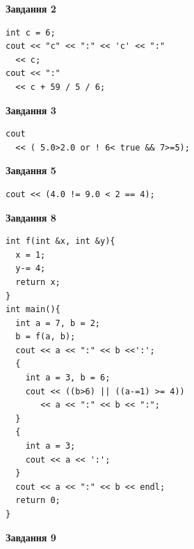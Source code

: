 \documentclass[12pt, ukrainian]{article}
\begin{document}
{\begin {large}
\begin{minipage}[t]{7.0cm}
\end{minipage}
\vline \hspace{1mm}
\begin{minipage}[t]{11.0cm}

\begin{center}
\textbf{Завдання 2}
\end{center}
\vspace{-8mm}

\begin{verbatim}
int c = 6;
cout << "c" << ":" << 'c' << ":" 
  << c;
cout << ":" 
  << c + 59 / 5 / 6;
\end{verbatim}



\begin{center}
\textbf{Завдання 3}
\end{center}
\vspace{-8mm}

\begin{verbatim}
cout 
  << ( 5.0>2.0 or ! 6< true && 7>=5);
\end{verbatim}



\begin{center}
\textbf{Завдання 5}
\end{center}
\vspace{-8mm}

\begin{verbatim}
cout << (4.0 != 9.0 < 2 == 4);
\end{verbatim}



\begin{center}
\textbf{Завдання 8}
\end{center}
\vspace{-8mm}

\begin{verbatim}
int f(int &x, int &y){
  x = 1;
  y-= 4;
  return x;
}
int main(){
  int a = 7, b = 2;
  b = f(a, b);
  cout << a << ":" << b <<':';
  {
    int a = 3, b = 6;
    cout << ((b>6) || ((a-=1) >= 4))
       << a << ":" << b << ":";
  }
  {
    int a = 3;
    cout << a << ':';
  }
  cout << a << ":" << b << endl;
  return 0;
}
\end{verbatim}

\end{minipage}


\begin{minipage}[t]{7.0cm}

\begin{center}
\textbf{Завдання 9}
\end{center}
\vspace{-8mm}


\end{minipage}
\end{large}}
\end{document}
